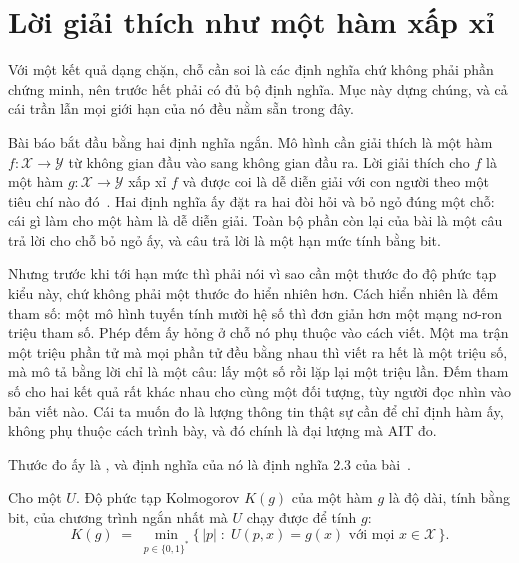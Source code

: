 \section{Lời giải thích như một hàm xấp xỉ}
\label{sec:ch13-ham-xap-xi}

%
Với một kết quả dạng chặn, chỗ cần soi là các định nghĩa chứ không phải phần
chứng minh, nên trước hết phải có đủ bộ định nghĩa. Mục này dựng chúng, và cả
cái trần lẫn mọi giới hạn của nó đều nằm sẵn trong đây.

Bài báo bắt đầu bằng hai định nghĩa ngắn. Mô hình cần giải thích là một hàm
$f : \mathcal{X} \to \mathcal{Y}$ từ không gian đầu vào sang không gian đầu ra.
Lời giải thích cho $f$ là một hàm $g : \mathcal{X} \to \mathcal{Y}$ xấp xỉ $f$
và được coi là dễ diễn giải với con người theo một tiêu chí nào
đó~\autocite{p26limits}. Hai định nghĩa ấy đặt ra hai đòi hỏi và bỏ ngỏ đúng một
chỗ: cái gì làm cho một hàm là dễ diễn giải. Toàn bộ phần còn lại của bài là một
câu trả lời cho chỗ bỏ ngỏ ấy, và câu trả lời là một hạn mức tính bằng bit.

Nhưng trước khi tới hạn mức thì phải nói vì sao cần một thước đo độ phức tạp
kiểu này, chứ không phải một thước đo hiển nhiên hơn. Cách hiển nhiên là đếm
tham số: một mô hình tuyến tính mười hệ số thì đơn giản hơn một mạng nơ-ron
triệu tham số. Phép đếm ấy hỏng ở chỗ nó phụ thuộc vào cách viết. Một ma trận
một triệu phần tử mà mọi phần tử đều bằng nhau thì viết ra hết là một triệu số,
mà mô tả bằng lời chỉ là một câu: lấy một số rồi lặp lại một triệu lần. Đếm tham
số cho hai kết quả rất khác nhau cho cùng một đối tượng, tùy người đọc nhìn vào
bản viết nào. Cái ta muốn đo là lượng thông tin thật sự cần để chỉ định hàm ấy,
không phụ thuộc cách trình bày, và đó chính là đại lượng mà AIT đo.

%
Thước đo ấy là , và định
nghĩa của nó là định nghĩa 2.3 của bài~\autocite{p26limits}.

\begin{definition}
\label{def:ch13-do-phuc-tap-kolmogorov}
Cho một  $U$. Độ phức tạp
Kolmogorov $K(g)$ của một hàm $g$ là độ dài, tính bằng bit, của chương trình
ngắn nhất mà $U$ chạy được để tính $g$:
\[
  K(g) \;=\; \min_{p \in \{0,1\}^{*}} \{\, |p| \;:\; U(p,x) = g(x) \text{ với mọi } x \in \mathcal{X} \,\}.
\]
\end{definition}

